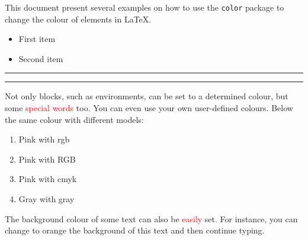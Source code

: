 \documentclass{article}
\begin{document}
This document present several examples on how to use the \texttt{color} package to change the colour of elements in \LaTeX.

\begin{itemize}
\item \textcolor{Mycolor1}{First item}
\item \textcolor{Mycolor2}{Second item}
\end{itemize}

\noindent
{\color{LightRubineRed} \rule{\linewidth}{1mm} }

\noindent
{\color{RubineRed} \rule{\linewidth}{1mm} }


Not only blocks, such as environments, can be set to a determined colour, but some \textcolor{red}{special words} too. You can even use your own user-defined colours. Below the same colour with different models:

\begin{enumerate}
\item \textcolor{mypink1}{Pink with rgb}
\item \textcolor{mypink2}{Pink with RGB}
\item \textcolor{mypink3}{Pink with cmyk}
\item \textcolor{mygray}{Gray with gray}
\end{enumerate}

The background colour of some text can also be \textcolor{red}{easily} set. For instance, you can change to orange the background of \colorbox{BurntOrange}{this text} and then continue typing.

\clearpage
\end{document}
